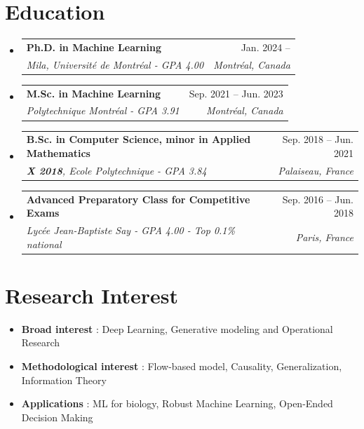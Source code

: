 \documentclass[letterpaper,11pt]{article}
\makeatletter
\newcommand{\resumeSubheading}[4]{
  \vspace{-2pt}\item
    \begin{tabular*}{0.97\textwidth}[t]{l@{\extracolsep{\fill}}r}
      \textbf{#1} & #2 \\
      \textit{\small#3} & \textit{\small #4} \\
    \end{tabular*}\vspace{-7pt}
}
\newcommand{\resumeSubHeadingListStart}{\begin{itemize}[leftmargin=0.15in, label={}]}
\newcommand{\resumeSubHeadingListEnd}{\end{itemize}}
\makeatother
\begin{document}
\section{Education}
  \resumeSubHeadingListStart
        \resumeSubheading
      {Ph.D. in Machine Learning}{Jan. 2024 -- }
      {Mila, Université de Montréal - GPA 4.00}{Montréal, Canada}
      \vspace{.2pt}
      \resumeSubheading
      {M.Sc. in Machine Learning}{Sep. 2021 -- Jun. 2023}
      {Polytechnique Montréal - GPA 3.91}{Montréal, Canada}
      \vspace{.2pt}
    \resumeSubheading
      {B.Sc. in Computer Science, minor in Applied Mathematics}{Sep. 2018 -- Jun. 2021}
      {\textbf{X 2018}, Ecole Polytechnique - GPA 3.84}{Palaiseau, France}
    \resumeSubheading
      {Advanced Preparatory Class for Competitive Exams}{Sep. 2016 -- Jun. 2018}
      {Lycée Jean-Baptiste Say - GPA 4.00 - Top 0.1\% national}{Paris, France}
      
  \resumeSubHeadingListEnd
\section{Research Interest}
        \begin{itemize}
            \item \textbf{Broad interest} : Deep Learning, Generative modeling and Operational Research
            \vspace{-5pt}
            \item \textbf{Methodological interest} : Flow-based model, Causality, Generalization, Information Theory
            \vspace{-5pt}
            \item \textbf{Applications} : ML for biology, Robust Machine Learning, Open-Ended Decision Making
        \end{itemize}
\end{document}
